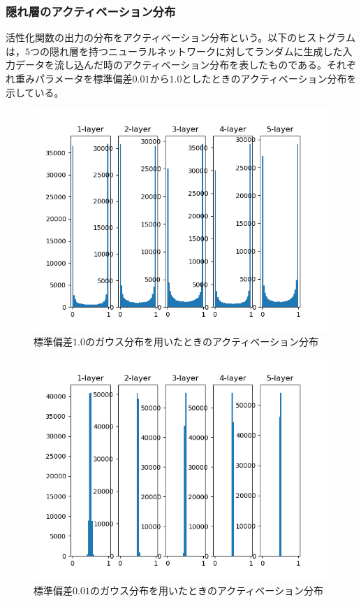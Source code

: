 \documentclass{jarticle}
\begin{document}
\subsubsection{隠れ層のアクティベーション分布}
活性化関数の出力の分布をアクティベーション分布という。以下のヒストグラムは，$5$つの隠れ層を持つニューラルネットワークに対してランダムに生成した入力データを流し込んだ時のアクティベーション分布を表したものである。それぞれ重みパラメータを標準偏差$0.01$から$1.0$としたときのアクティベーション分布を示している。
\begin{figure}[htbp]
	\begin{center}
		\includegraphics[scale = 0.5]{histogram1.png}
		\caption{標準偏差$1.0$のガウス分布を用いたときのアクティベーション分布}
		\label{histogram1}
	\end{center}
\end{figure}
\begin{figure}[htbp]
	\begin{center}
		\includegraphics[scale = 0.5]{histogram2.png}
		\caption{標準偏差$0.01$のガウス分布を用いたときのアクティベーション分布}
		\label{histogram2}
	\end{center}
\end{figure}
\end{document}
